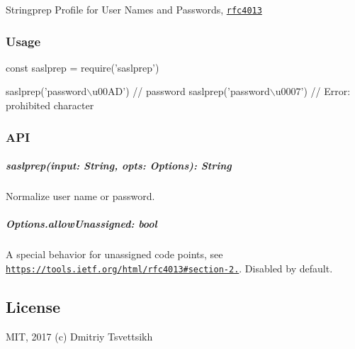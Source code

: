 \href{https://travis-ci.org/reklatsmasters/saslprep}{\tt } \href{https://npmjs.org/package/saslprep}{\tt } \href{https://npmjs.org/package/saslprep}{\tt } \href{https://npmjs.org/package/saslprep}{\tt } \href{https://npmjs.org/package/saslprep}{\tt }

Stringprep Profile for User Names and Passwords, \href{https://tools.ietf.org/html/rfc4013}{\tt rfc4013}

\subsubsection*{Usage}


\begin{DoxyCode}
const saslprep = require('saslprep')

saslprep('password\(\backslash\)u00AD') // password
saslprep('password\(\backslash\)u0007') // Error: prohibited character
\end{DoxyCode}


\subsubsection*{A\+PI}

\subparagraph*{{\ttfamily saslprep(input\+: String, opts\+: Options)\+: String}}

Normalize user name or password.

\subparagraph*{{\ttfamily Options.\+allow\+Unassigned\+: bool}}

A special behavior for unassigned code points, see \href{https://tools.ietf.org/html/rfc4013#section-2.5}{\tt https\+://tools.\+ietf.\+org/html/rfc4013\#section-\/2.}. Disabled by default.

\subsection*{License}

M\+IT, 2017 (c) Dmitriy Tsvettsikh 